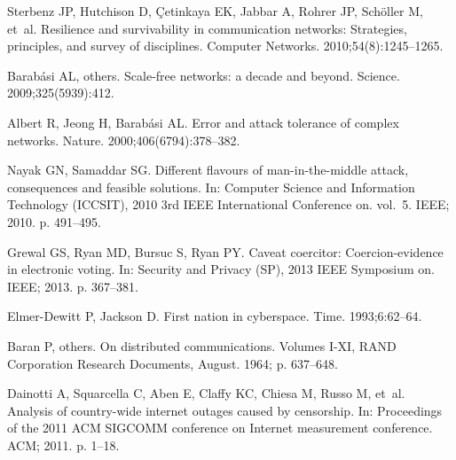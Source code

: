 \documentclass[10pt,letterpaper]{article}
\begin{document}
\nolinenumbers

%

%
%
% 
\begin{thebibliography}{10}

Sterbenz JP, Hutchison D, Çetinkaya EK, Jabbar A, Rohrer JP, Schöller M,
  et~al.
\newblock Resilience and survivability in communication networks: {Strategies},
  principles, and survey of disciplines.
\newblock Computer Networks. 2010;54(8):1245--1265.

Barabási AL, {others}.
\newblock Scale-free networks: a decade and beyond.
\newblock Science. 2009;325(5939):412.

Albert R, Jeong H, Barabási AL.
\newblock Error and attack tolerance of complex networks.
\newblock Nature. 2000;406(6794):378--382.

Nayak GN, Samaddar SG.
\newblock Different flavours of man-in-the-middle attack, consequences and
  feasible solutions.
\newblock In: Computer {Science} and {Information} {Technology} ({ICCSIT}),
  2010 3rd {IEEE} {International} {Conference} on. vol.~5. IEEE; 2010. p.
  491--495.

Grewal GS, Ryan MD, Bursuc S, Ryan PY.
\newblock Caveat coercitor: {Coercion}-evidence in electronic voting.
\newblock In: Security and {Privacy} ({SP}), 2013 {IEEE} {Symposium} on. IEEE;
  2013. p. 367--381.

Elmer-Dewitt P, Jackson D.
\newblock First nation in cyberspace.
\newblock Time. 1993;6:62--64.

Baran P, {others}.
\newblock On distributed communications.
\newblock Volumes I-XI, RAND Corporation Research Documents, August. 1964; p.
  637--648.

Dainotti A, Squarcella C, Aben E, Claffy KC, Chiesa M, Russo M, et~al.
\newblock Analysis of country-wide internet outages caused by censorship.
\newblock In: Proceedings of the 2011 {ACM} {SIGCOMM} conference on {Internet}
  measurement conference. ACM; 2011. p. 1--18.


\end{thebibliography}
\end{document}
